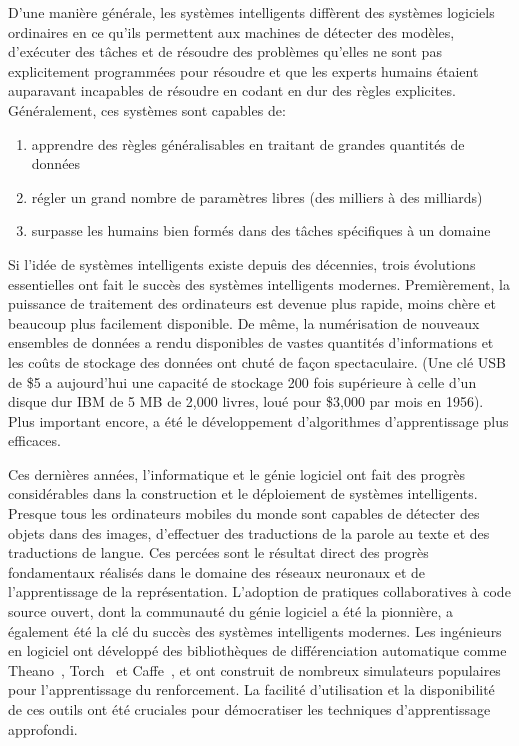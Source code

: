 D'une manière générale, les systèmes intelligents diffèrent des systèmes logiciels ordinaires en ce qu'ils permettent aux machines de détecter des modèles, d'exécuter des tâches et de résoudre des problèmes qu'elles ne sont pas explicitement programmées pour résoudre et que les experts humains étaient auparavant incapables de résoudre en codant en dur des règles explicites. Généralement, ces systèmes sont capables de:\\
%
\begin{enumerate}
\item apprendre des règles généralisables en traitant de grandes quantités de données
\item régler un grand nombre de paramètres libres (des milliers à des milliards)
\item surpasse les humains bien formés dans des tâches spécifiques à un domaine
\end{enumerate}
%
Si l'idée de systèmes intelligents existe depuis des décennies, trois évolutions essentielles ont fait le succès des systèmes intelligents modernes. Premièrement, la puissance de traitement des ordinateurs est devenue plus rapide, moins chère et beaucoup plus facilement disponible. De même, la numérisation de nouveaux ensembles de données a rendu disponibles de vastes quantités d'informations et les coûts de stockage des données ont chuté de façon spectaculaire. (Une clé USB de \$5 a aujourd'hui une capacité de stockage 200 fois supérieure à celle d'un disque dur IBM de 5 MB de 2,000 livres, loué pour \$3,000 par mois en 1956). Plus important encore, a été le développement d'algorithmes d'apprentissage plus efficaces.

Ces dernières années, l'informatique et le génie logiciel ont fait des progrès considérables dans la construction et le déploiement de systèmes intelligents. Presque tous les ordinateurs mobiles du monde sont capables de détecter des objets dans des images, d'effectuer des traductions de la parole au texte et des traductions de langue. Ces percées sont le résultat direct des progrès fondamentaux réalisés dans le domaine des réseaux neuronaux et de l'apprentissage de la représentation. L'adoption de pratiques collaboratives à code source ouvert, dont la communauté du génie logiciel a été la pionnière, a également été la clé du succès des systèmes intelligents modernes. Les ingénieurs en logiciel ont développé des bibliothèques de différenciation automatique comme Theano~\citep{bergstra2010theano}, Torch~\citep{collobert2002torch} et Caffe~\citep{jia2014caffe}, et ont construit de nombreux simulateurs populaires pour l'apprentissage du renforcement. La facilité d'utilisation et la disponibilité de ces outils ont été cruciales pour démocratiser les techniques d'apprentissage approfondi.


